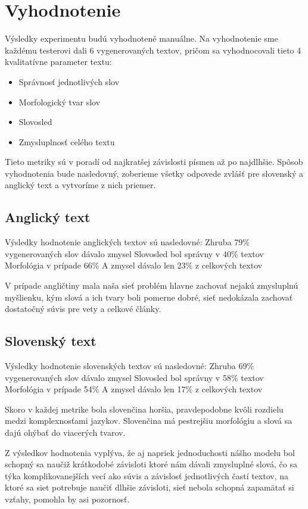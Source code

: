 \section{Vyhodnotenie}
Výsledky experimentu budú vyhodnotené manuálne. Na vyhodnotenie sme každému testerovi dali 6 vygenerovaných textov, pričom sa vyhodnocovali tieto 4 kvalitatívne parameter textu:

\begin{itemize}
    \item Správnosť jednotlivých slov
    \item Morfologický tvar slov
    \item Slovosled
    \item Zmysluplnosť celého textu
\end{itemize}

Tieto metriky sú v poradí od najkratšej závislosti písmen až po najdlhšie. Spôsob vyhodnotenia bude nasledovný, zoberieme všetky odpovede zvlášť pre slovenský a anglický text a vytvoríme z nich priemer.

\subsection{Anglický text}
Výsledky hodnotenie anglických textov sú nasledovné:
Zhruba 79\% vygenerovaných slov dávalo zmysel
Slovosled bol správny v 40\% textov
Morfológia v prípade 66\%
A zmysel dávalo len 23\% z celkových textov

V prípade angličtiny mala naša sieť problém hlavne zachovať nejakú zmysluplnú myšlienku, kým slová a ich tvary boli pomerne dobré, sieť nedokázala zachovať dostatočný súvis pre vety a celkové články.

\subsection{Slovenský text}
Výsledky hodnotenie slovenských textov sú nasledovné:
Zhruba 69\% vygenerovaných slov dávalo zmysel
Slovosled bol správny v 58\% textov
Morfológia v prípade 54\%
A zmysel dávalo len 17\% z celkových textov

Skoro v každej metrike bola slovenčina horšia, pravdepodobne kvôli rozdielu medzi komplexnosťami jazykov. Slovenčina má pestrejšiu morfológiu a slová sa dajú ohýbať do viacerých tvarov.

Z výsledkov hodnotenia vyplýva, že aj napriek jednoduchosti nášho modelu bol schopný sa naučiž krátkodobé závisloti ktoré nám dávali zmysluplné slová, čo sa týka komplikovanejších vecí ako súvis a závislosť jednotlivých častí textov, na ktoré sa siet potrebuje naučiť dlhšie závisloti, sieť nebola schopná zapamätať si vzťahy, pomohla by asi pozornosť.


